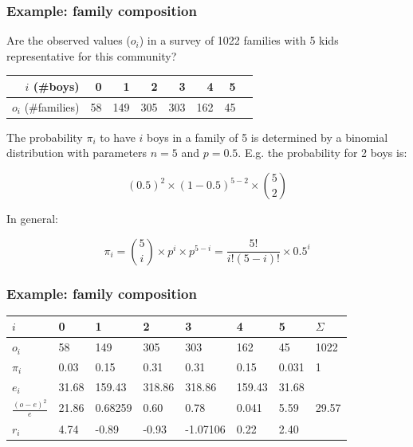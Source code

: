 \documentclass{beamer}
\begin{document}
\begin{frame}
  \frametitle{Example: family composition}
  Are the observed values ($o_i$) in a survey of 1022 families with 5 kids representative for this community?
  \begin{table}[h]
\begin{tabular}{@{}rrrrrrrr@{}}
\toprule
$i$ (\#boys)         & 0  & 1   & 2   & 3   & 4   & 5  &  \\ \midrule
$o_{i}$ (\#families) & 58 & 149 & 305 & 303 & 162 & 45 &  \\ \bottomrule
\end{tabular}
\end{table}
\pause
The probability $\pi_{i}$ to have $i$ boys in a family of 5 is determined by a binomial distribution with parameters $n=5$ and $p=0.5$. E.g. the probability for 2 boys is:

\[ (0.5)^{2} \times (1-0.5)^{5-2} \times \binom{5}{2} \]

In general:

\[ \pi_{i} = \binom{5}{i}\times p^{i} \times p^{5-i} = \frac{5!}{i!(5-i)!}\times 0.5^{i} \]
\end{frame}

\begin{frame}
  \frametitle{Example: family composition}
  \begin{table}[h]
\begin{tabular}{@{}llllllll@{}}
\toprule
$i$                         & 0        & 1        & 2        & 3        & 4       & 5       & $\Sigma$\\ \midrule
$o_i$                      & 58       & 149      & 305      & 303      & 162     & 45      & 1022    \\
$\pi_i$                      & 0.03    & 0.15    & 0.31    & 0.31  & 0.15 & 0.031 & 1       \\
$e_i$                      & 31.68   & 159.43  & 318.86  & 318.86  & 159.43 & 31.68  &         \\
$\frac{(o-e)^{2}}{e}$ & 21.86 & 0.68259  & 0.60   & 0.78  & 0.041 & 5.59 & 29.57 \\
$r_i$                      & 4.74   & -0.89 & -0.93 & -1.07106 & 0.22 & 2.40 &         \\ \bottomrule
\end{tabular}
\end{table}
\end{frame}
\end{document}
